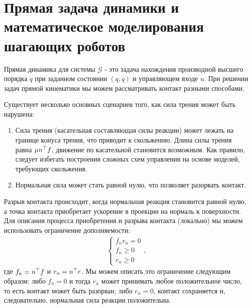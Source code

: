 \section{Прямая задача динамики и математическое моделирования шагающих роботов}\label{sec:ch2/sect5}
Прямая динамика для системы $\mathcal{G}$ - это задача нахождения производной высшего порядка $\ddot{{q}}$ при заданном состоянии $({q}, \dot{{q}})$ и управляющем входе ${u}$. При решении задач прямой кинематики мы можем рассматривать контакт разными способами.

Существует несколько основных сценариев того, как сила трения может быть нарушена:
%
\begin{enumerate}
	\item Сила трения (касательная составляющая силы реакции) может лежать на границе конуса трения, что приводит к скольжению. Длина силы трения равна $\mu {n}^\top {f}$, движение по касательной становится возможным. Как правило, следует избегать построения сложных схем управления на основе моделей, требующих скольжения.
	\item Нормальная сила может стать равной нулю, что позволяет разорвать контакт.
\end{enumerate}

Разрыв контакта происходит, когда нормальная реакция становится равной нулю, а точка контакта приобретает ускорение в проекции на нормаль к поверхности.
%
Для описания процесса приобретения и разрыва контакта (локально) мы можем использовать ограничение дополняемости:
%
\begin{align}
	\label{eq:part2_cond}
	\begin{cases}
		f_n r_n = 0 \\
		f_n \geq 0 \\
		r_n \geq 0
	\end{cases},
\end{align}
где $f_n = {n}^\top{f}$ и $r_n ={n}^\top{r}$. Мы можем описать это ограничение следующим образом: либо $f_n = 0$ и тогда $r_n$ может принимать любое положительное число, то есть контакт может быть разорван; либо $r_n = 0$, контакт сохраняется и, следовательно, нормальная сила реакции положительна.

